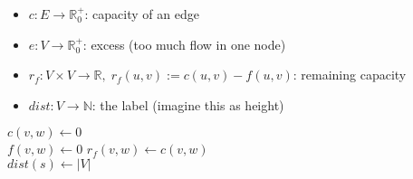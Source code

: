 \documentclass{article}
\begin{document}
\begin{preview}
    \begin{itemize}
        \item $c:E \rightarrow \mathbb{R}_0^+$: capacity of an edge
        \item $e: V \rightarrow \mathbb{R}_0^+$: excess (too much flow in one node)
        \item $r_f: V \times V \rightarrow \mathbb{R}, \; r_f(u,v) := c(u,v) - f(u,v) $: remaining capacity
        \item $dist: V \rightarrow \mathbb{N}$: the label (imagine this as height)
    \end{itemize}

    \begin{algorithm}[H]
        \begin{algorithmic}
                 
                    \State $c(v,w) \gets 0$ 
                \EndFor
                \\
                 
                    \State $f(v,w) \gets 0$ 
                    \State $r_f(v,w) \gets c(v,w)$  
                \EndFor
                \\
                \State $dist(s) \gets |V|$


\end{algorithmic}
\end{algorithm}
\end{preview}
\end{document}

